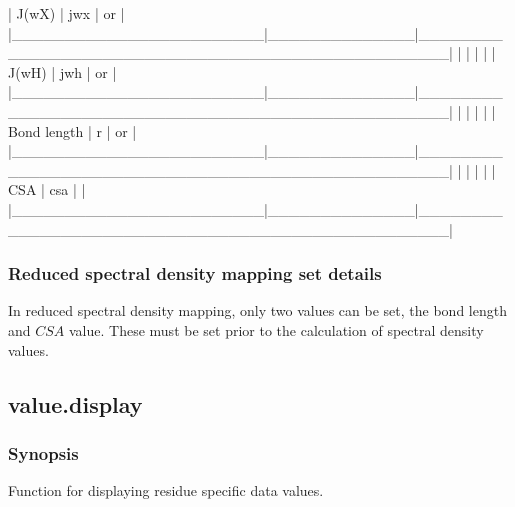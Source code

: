 | J(wX)                  | jwx          | 
 or 
                   |
|\_\_\_\_\_\_\_\_\_\_\_\_\_\_\_\_\_\_\_\_\_\_\_\_|\_\_\_\_\_\_\_\_\_\_\_\_\_\_|\_\_\_\_\_\_\_\_\_\_\_\_\_\_\_\_\_\_\_\_\_\_\_\_\_\_\_\_\_\_\_\_\_\_\_\_\_\_\_\_\_\_\_\_\_\_\_\_\_\_|
|                        |              |                                                  |
| J(wH)                  | jwh          | 
 or 
                   |
|\_\_\_\_\_\_\_\_\_\_\_\_\_\_\_\_\_\_\_\_\_\_\_\_|\_\_\_\_\_\_\_\_\_\_\_\_\_\_|\_\_\_\_\_\_\_\_\_\_\_\_\_\_\_\_\_\_\_\_\_\_\_\_\_\_\_\_\_\_\_\_\_\_\_\_\_\_\_\_\_\_\_\_\_\_\_\_\_\_|
|                        |              |                                                  |
| Bond length            | r            | 
 or 
                 |
|\_\_\_\_\_\_\_\_\_\_\_\_\_\_\_\_\_\_\_\_\_\_\_\_|\_\_\_\_\_\_\_\_\_\_\_\_\_\_|\_\_\_\_\_\_\_\_\_\_\_\_\_\_\_\_\_\_\_\_\_\_\_\_\_\_\_\_\_\_\_\_\_\_\_\_\_\_\_\_\_\_\_\_\_\_\_\_\_\_|
|                        |              |                                                  |
| CSA                    | csa          | 
                                 |
|\_\_\_\_\_\_\_\_\_\_\_\_\_\_\_\_\_\_\_\_\_\_\_\_|\_\_\_\_\_\_\_\_\_\_\_\_\_\_|\_\_\_\_\_\_\_\_\_\_\_\_\_\_\_\_\_\_\_\_\_\_\_\_\_\_\_\_\_\_\_\_\_\_\_\_\_\_\_\_\_\_\_\_\_\_\_\_\_\_|



\subsubsection{Reduced spectral density mapping set details}

In reduced spectral density mapping, only two values can be set, the bond length and $CSA$
value.  These must be set prior to the calculation of spectral density values.


\newpage

\subsection{value.display}


\subsubsection{Synopsis}

Function for displaying residue specific data values.

